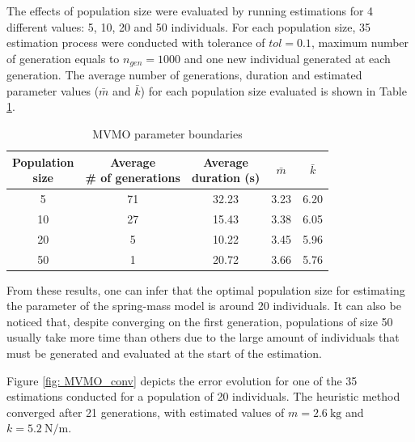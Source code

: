 The effects of population size were evaluated by running estimations for 4 different values: 5, 10, 20 and 50 individuals. For each population size, 35 estimation process were conducted with tolerance of $tol = 0.1$, maximum number of generation equals to $n_{gen}=1000$ and one new individual generated at each generation. The average number of generations, duration and estimated parameter values ($\bar{m}$ and $\bar{k}$) for each population size evaluated is shown in Table \ref{tab: spring_mass_MVMO_size}.

\begin{table}[!h]
	\centering
	\caption{MVMO parameter boundaries}
	\begin{tabular}{c|cccc}
		\shortstack{Population \\ size} & \shortstack{Average \\ \# of generations} & \shortstack{Average \\ duration (s)} & $\bar{m}$ & $\bar{k}$ \\
		\hline
		5 & 71 & 32.23 & 3.23 & 6.20 \\
		10 & 27 & 15.43 & 3.38 & 6.05 \\
		20 & 5 & 10.22 & 3.45 & 5.96 \\
		50 & 1 & 20.72 & 3.66 & 5.76 \\
	\end{tabular}
	\label{tab: spring_mass_MVMO_size}
\end{table}

From these results, one can infer that the optimal population size for estimating the parameter of the spring-mass model is around 20 individuals. It can also be noticed that, despite converging on the first generation, populations of size 50 usually take more time than others due to the large amount of individuals that must be generated and evaluated at the start of the estimation.

Figure \ref{fig: MVMO_conv} depicts the error evolution for one of the 35 estimations conducted for a population of 20 individuals. The heuristic method converged after 21 generations, with estimated values of $m=2.6\ \text{kg}$ and $k=5.2\ \text{N/m}$.

